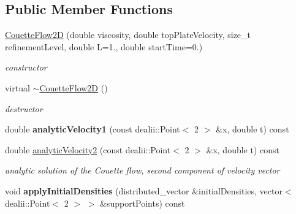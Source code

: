 \subsection*{Public Member Functions}
\begin{DoxyCompactItemize}
\item 
\hyperlink{classnatrium_1_1CouetteFlow2D_ac5abfdca75a910fb11cad175942de50f}{Couette\-Flow2\-D} (double viscosity, double top\-Plate\-Velocity, size\-\_\-t refinement\-Level, double L=1., double start\-Time=0.)
\begin{DoxyCompactList}\small\item\em constructor \end{DoxyCompactList}\item 
\hypertarget{classnatrium_1_1CouetteFlow2D_a97b61b0f71dc653427ba3db46e185873}{virtual \hyperlink{classnatrium_1_1CouetteFlow2D_a97b61b0f71dc653427ba3db46e185873}{$\sim$\-Couette\-Flow2\-D} ()}\label{classnatrium_1_1CouetteFlow2D_a97b61b0f71dc653427ba3db46e185873}

\begin{DoxyCompactList}\small\item\em destructor \end{DoxyCompactList}\item 
\hypertarget{classnatrium_1_1CouetteFlow2D_a501e1b94630213ea9a53c1446eea7758}{double {\bfseries analytic\-Velocity1} (const dealii\-::\-Point$<$ 2 $>$ \&x, double t) const }\label{classnatrium_1_1CouetteFlow2D_a501e1b94630213ea9a53c1446eea7758}

\item 
\hypertarget{classnatrium_1_1CouetteFlow2D_a451b61096f36f0b7f74b9c3f7ceb75fb}{double \hyperlink{classnatrium_1_1CouetteFlow2D_a451b61096f36f0b7f74b9c3f7ceb75fb}{analytic\-Velocity2} (const dealii\-::\-Point$<$ 2 $>$ \&x, double t) const }\label{classnatrium_1_1CouetteFlow2D_a451b61096f36f0b7f74b9c3f7ceb75fb}

\begin{DoxyCompactList}\small\item\em analytic solution of the Couette flow, second component of velocity vector \end{DoxyCompactList}\item 
\hypertarget{classnatrium_1_1CouetteFlow2D_a59ab86c4c395e3019060181d3b620765}{void {\bfseries apply\-Initial\-Densities} (distributed\-\_\-vector \&initial\-Densities, vector$<$ dealii\-::\-Point$<$ 2 $>$ $>$ \&support\-Points) const }\label{classnatrium_1_1CouetteFlow2D_a59ab86c4c395e3019060181d3b620765}


\end{DoxyCompactItemize}
